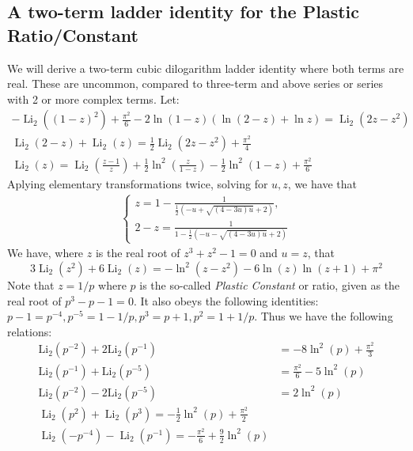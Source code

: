 \documentclass[12pt]{article}
\begin{document}
\subsection{A two-term ladder identity for the Plastic Ratio/Constant}
 We will derive a two-term cubic dilogarithm ladder identity where both terms are real. These are uncommon, compared to three-term and above series or series with 2 or more complex terms. Let:
\begin{equation*}
\begin{aligned}
- \operatorname{Li}_2((1-z)^2) + \frac{\pi^2}{6} - 2 \ln(1-z) \left( \ln(2-z) + \ln z \right) = \operatorname{Li}_2(2z - z^2)\\
\operatorname{Li}_2(2-z) + \operatorname{Li}_2(z) = \frac{1}{2} \operatorname{Li}_2(2z - z^2) + \frac{\pi^2}{4}\\
\operatorname{Li}_2(z) = \operatorname{Li}_2\left(\frac{z-1}{z}\right) + \frac{1}{2} \ln^2 \left( \frac{z}{1-z} \right) - \frac{1}{2} \ln^2(1-z) + \frac{\pi^2}{6}
\end{aligned}
\end{equation*}
 Aplying elementary transformations twice, solving for $u,z$, we have that 
\begin{equation*}
\begin{aligned}
\left\{
\begin{array}{l}
z=1-\frac{1}{\frac{1}{2} \left(-u + \sqrt{(4 - 3u) u} + 2 \right)} , \\
2 - z = \frac{1}{1 - \frac{1}{2} \left(-u - \sqrt{(4 - 3u) u} + 2 \right)}
\end{array}
\right.
\end{aligned}
\end{equation*}
 We have, where $z$ is the real root of $z^3+z^2-1=0$ and $u=z$, that 
\begin{equation*}
3 \operatorname{Li}_2(z^2) + 6 \operatorname{Li}_2(z) = - \ln^2(z - z^2) - 6 \ln(z) \ln(z + 1) + \pi^2
\end{equation*}
 Note that $z=1/p$ where $p$ is the so-called \textit{Plastic Constant} or ratio, given as the real root of $p^3-p-1=0$. It also obeys 
 the following identities: $p-1=p^{-4}, p^{-5}=1-1/p,p^{3}=p+1,p^{2}=1+1/p$. Thus we have the following relations: 
\begin{equation*}
\begin{aligned}
\mathrm{Li_2}(p^{-2}) + 2\mathrm{Li_2}(p^{-1}) &= -8\ln^2(p) + \frac{\pi^2}{3} \\
\mathrm{Li_2}(p^{-1}) + \mathrm{Li_2}(p^{-5}) &= \frac{\pi^2}{6} - 5\ln^2(p) \\ 
\mathrm{Li_2}(p^{-2}) - 2\mathrm{Li_2}(p^{-5}) &= 2\ln^2(p)\\
\operatorname{Li}_2(p^2) + \operatorname{Li}_2(p^3) = -\frac{1}{2} \ln^2(p) + \frac{\pi^2}{2}\\
\operatorname{Li}_2(-p^{-4}) - \operatorname{Li}_2(p^{-1}) = -\frac{\pi^2}{6} + \frac{9}{2} \ln^2(p)
\end{aligned}
\end{equation*}
\end{document}
